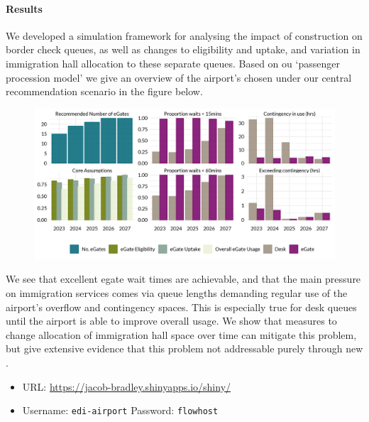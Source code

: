 \documentclass[10pt]{article}
\begin{document}
\paragraph{Results}
We developed a simulation framework for analysing the impact of  construction on border check queues, as well as changes to  eligibility and uptake, and variation in immigration hall allocation to these separate queues. Based on ou `passenger procession model' we give an overview of the airport's chosen  under our central recommendation scenario in the figure below. %
\begin{figure}[!h]
    \centering
    \includegraphics[width=\textwidth]{figures/core_rec_fig.png}
\end{figure}

\vspace{-5pt}

We see that excellent \gls{egate} wait times are achievable, and that the main pressure on immigration services comes via queue lengths demanding regular use of the airport's overflow and contingency spaces. This is especially true for desk queues until the airport is able to improve overall  usage. We show that measures to change allocation of immigration hall space over time can mitigate this problem, but give extensive evidence that this problem not addressable purely through new . 


\begin{tcolorbox}[
colframe=edi-dark-purple,
colback=edi-light-purple,
fonttitle=\bfseries,
title = {Use our Shiny Application to interactively explore demand scenarios!}]
\vspace{-1.5mm}
\begin{itemize}
\item URL: \url{https://jacob-bradley.shinyapps.io/shiny/}
\item Username: \texttt{edi-airport} \quad Password: \texttt{flowhost}
\vspace{-1.5mm}
\end{itemize}
\end{tcolorbox}
\end{document}

